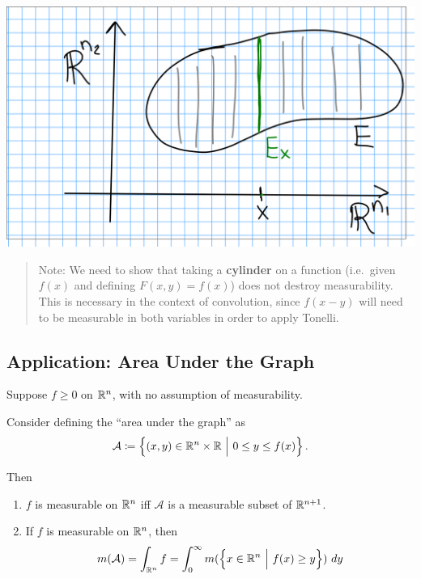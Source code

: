 \includegraphics{figures/2019-10-08-11:35.png}\\

\begin{quote}
Note: We need to show that taking a \textbf{cylinder} on a function
(i.e.~given \(f(x)\) and defining \(F(x, y) = f(x)\)) does not destroy
measurability. This is necessary in the context of convolution, since
\(f(x - y)\) will need to be measurable in both variables in order to
apply Tonelli.
\end{quote}

\hypertarget{application-area-under-the-graph}{%
\subsection{Application: Area Under the
Graph}\label{application-area-under-the-graph}}

Suppose \(f \geq 0\) on \({\mathbb{R}}^n\), with no assumption of measurability.

Consider defining the ``area under the graph'' as
\begin{align*}
\mathcal{A} \coloneqq \left\{{(x, y) \in{\mathbb{R}}^n \times {\mathbb{R}} {~\mathrel{\Big|}~} 0 \leq y \leq f(x)}\right\}
.\end{align*}

Then

\begin{enumerate}
\def\labelenumi{\arabic{enumi}.}
\item
  \(f\) is measurable on \({\mathbb{R}}^n\) iff \(\mathcal{A}\) is a measurable
  subset of \({\mathbb{R}}^{n+1}\).
\item
  If \(f\) is measurable on \({\mathbb{R}}^n\), then
  \begin{align*}
  m(\mathcal{A}) = \int_{{\mathbb{R}}^n} f = \int_0^\infty m(\left\{{x\in{\mathbb{R}}^n {~\mathrel{\Big|}~} f(x) \geq y}\right\}) ~dy
  \end{align*}
\end{enumerate}


